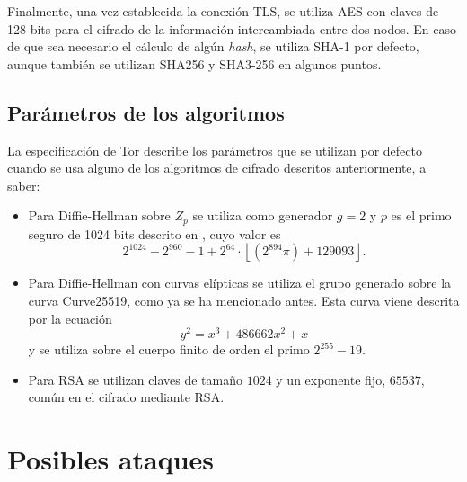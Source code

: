 \documentclass[
  a4paper,
  12pt,
  spanish,
]{scrartcl}
\begin{document}
Finalmente, una vez establecida la conexión TLS, se utiliza AES con claves de 128 bits para el cifrado de la información intercambiada entre dos nodos. En caso de que sea necesario el cálculo de algún \textit{hash}, se utiliza SHA-1 por defecto, aunque también se utilizan SHA256 y SHA3-256 en algunos puntos.

\subsection{Parámetros de los algoritmos}

La especificación de Tor describe los parámetros que se utilizan por defecto cuando se usa alguno de los algoritmos de cifrado descritos anteriormente, a saber: \begin{itemize}
  \item Para Diffie-Hellman sobre \(Z_p\) se utiliza como generador \(g=2\) y \(p\) es el primo seguro de 1024 bits descrito en \parencite{carrel_internet_1998}, cuyo valor es \[
    2^{1024} - 2^{960} - 1 + 2^{64} \cdot \left\lfloor (2^{894} \pi) + 129093 \right\rfloor.
  \]
  \item Para Diffie-Hellman con curvas elípticas se utiliza el grupo generado sobre la curva Curve25519, como ya se ha mencionado antes. Esta curva viene descrita por la ecuación \[
    y^{2}=x^{3}+486662x^{2}+x
  \]
  y se utiliza sobre el cuerpo finito de orden el primo \(2^{255}-19\).
  \item Para RSA se utilizan claves de tamaño \(1024\) y un exponente fijo, \(65537\), común en el cifrado mediante RSA.
\end{itemize}

\section{Posibles ataques}
\label{sec:ataques}



\newpage
\printbibliography
\end{document}
